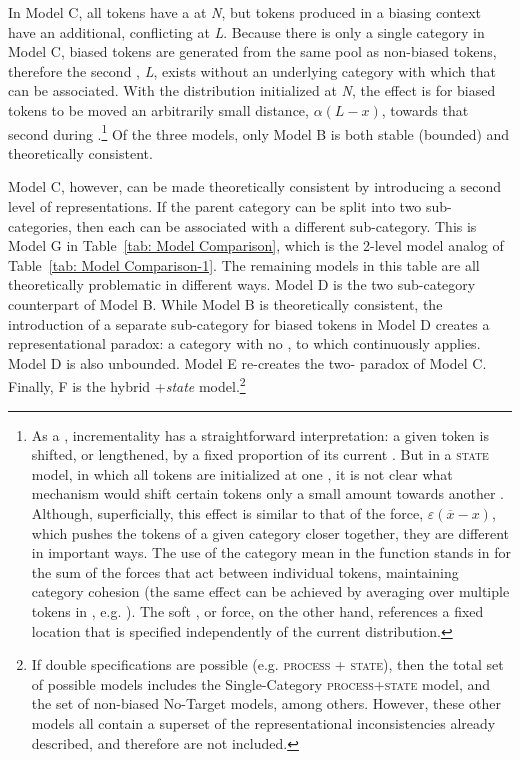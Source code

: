 In Model C, all tokens have a  at \emph{N}, but tokens produced
in a biasing context have an additional, conflicting  at \emph{L}.
Because there is only a single category in Model C, biased tokens
are generated from the same pool as non-biased tokens, therefore the
second , \emph{L}, exists without an underlying category with
which that  can be associated. With the distribution initialized
at \emph{N}, the effect is for biased tokens to be moved an arbitrarily
small distance, $\alpha(L-x)$, towards that second  during
.\footnote{As a , incrementality has a straightforward interpretation:
a given token is shifted, or lengthened, by a fixed proportion of
its current . But in a \textsc{state} model, in which all tokens
are initialized at one , it is not clear what mechanism would
shift certain tokens only a small amount towards another . Although,
superficially, this effect is similar to that of the 
force, $\varepsilon(\overline{x}-x)$, which pushes the tokens of
a given category closer together, they are different in important
ways. The use of the category mean in the  function stands
in for the sum of the forces that act between individual tokens, maintaining
category cohesion (the same effect can be achieved by averaging over
multiple tokens in , e.g. \citealt{Pierrehumbert2000,Wedela}).
The soft , or  force, on the other hand, references a
fixed  location that is specified independently of the current
distribution. } Of the three models, only Model B is both stable (bounded) and
theoretically consistent. 

Model C, however, can be made theoretically consistent by introducing
a second level of representations. If the parent category can be split
into two sub-categories, then each  can be associated with a
different sub-category. This is Model G in Table~\ref{tab: Model Comparison},
which is the 2-level model analog of Table~\ref{tab: Model Comparison-1}.
The remaining models in this table are all theoretically problematic
in different ways. Model D is the two sub-category counterpart of
Model B. While Model B is theoretically consistent, the introduction
of a separate sub-category for biased tokens in Model D creates a
representational paradox: a category with no , to which 
continuously applies. Model D is also unbounded. Model E re-creates
the two- paradox of Model C. Finally, F is the hybrid +\emph{state}
model.\footnote{If double specifications are possible (e.g. \textsc{process} + \textsc{state}),
then the total set of possible models includes the Single-Category
\textsc{process}+\textsc{state} model, and the set of non-biased No-Target
models, among others. However, these other models all contain a superset
of the representational inconsistencies already described, and therefore
are not included.}

